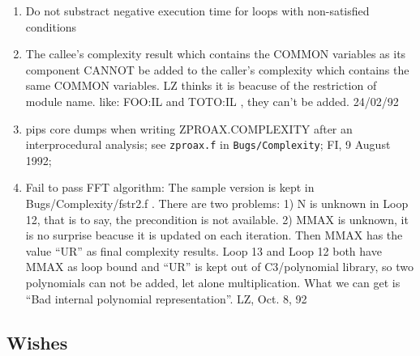 \begin{enumerate}

  \item Do not substract negative execution time for loops with
	non-satisfied conditions

  \item The callee's complexity result which contains the COMMON
	variables as its component CANNOT be added to the caller's
	complexity which contains the same COMMON variables.
	LZ thinks it is beacuse of the restriction of module name.
	like: FOO:IL and TOTO:IL , they can't be added. 24/02/92

  \item pips core dumps when writing ZPROAX.COMPLEXITY after an
	interprocedural analysis;
	see \verb+zproax.f+ in \verb+Bugs/Complexity+;
	FI, 9 August 1992;

  \item Fail to pass FFT algorithm:
	The sample version is kept in Bugs/Complexity/fstr2.f .
	There are two problems: 1) N is unknown in Loop 12, that is to
	say, the precondition is not available.
	2) MMAX is unknown, it is no surprise beacuse it is updated
	on each iteration. Then MMAX has the value ``UR'' as final
	complexity results. Loop 13 and Loop 12 both have MMAX as 
	loop bound and ``UR'' is kept out of C3/polynomial library,
	so two polynomials can not be added, let alone multiplication.
	What we can get is ``Bad internal polynomial representation''.
	LZ, Oct. 8, 92


\end{enumerate}

\subsection{Wishes}

